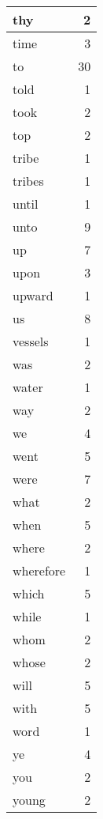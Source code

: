 \begin{center}
\begin{longtable}{l|r}
thy & 2 \\ \hline
time & 3 \\ \hline
to & 30 \\ \hline
told & 1 \\ \hline
took & 2 \\ \hline
top & 2 \\ \hline
tribe & 1 \\ \hline
tribes & 1 \\ \hline
until & 1 \\ \hline
unto & 9 \\ \hline
up & 7 \\ \hline
upon & 3 \\ \hline
upward & 1 \\ \hline
us & 8 \\ \hline
vessels & 1 \\ \hline
was & 2 \\ \hline
water & 1 \\ \hline
way & 2 \\ \hline
we & 4 \\ \hline
went & 5 \\ \hline
were & 7 \\ \hline
what & 2 \\ \hline
when & 5 \\ \hline
where & 2 \\ \hline
wherefore & 1 \\ \hline
which & 5 \\ \hline
while & 1 \\ \hline
whom & 2 \\ \hline
whose & 2 \\ \hline
will & 5 \\ \hline
with & 5 \\ \hline
word & 1 \\ \hline
ye & 4 \\ \hline
you & 2 \\ \hline
young & 2 \\ \hline
\end{longtable}
\end{center}



\normalsize



